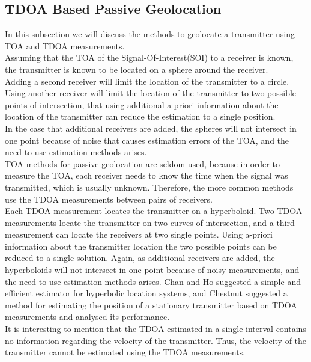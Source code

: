 \documentclass[10pt,a4paper]{report}
\begin{document}
\subsection{TDOA Based Passive Geolocation}
In this subsection we will discuss the methods to geolocate a transmitter using TOA and TDOA measurements.\\
Assuming that the TOA of the Signal-Of-Interest(SOI) to a receiver is known, the transmitter is known to be located on a sphere around the receiver. \\
Adding a second receiver will limit the location of the transmitter to a circle. Using another receiver will limit the location of the transmitter to two possible points of intersection, that using additional a-priori information about the location of the transmitter can reduce the estimation to a single position.\\
In the case that additional receivers are added, the spheres will not intersect in one point because of noise that causes estimation errors of the TOA, and the need to use estimation methods arises.\\

TOA methods for passive geolocation are seldom used, because in order to measure the TOA, each receiver needs to know the time when the signal was transmitted, which is usually unknown.
Therefore, the more common methods use the TDOA measurements between pairs of receivers.\\

Each TDOA measurement locates the transmitter on a hyperboloid. Two TDOA measurements locate the transmitter on two curves of intersection, and a third measurement can locate the receivers at two single points. Using a-priori information about the transmitter location the two possible points can be reduced to a single solution.
Again, as additional receivers are added, the hyperboloids will not intersect in one point because of noisy measurements, and the need to use estimation methods arises.
Chan and Ho \cite{chan_and_ho} suggested a simple and efficient estimator for hyperbolic location systems, and Chestnut \cite{chestnut} suggested a method for estimating the position of a stationary transmitter based on TDOA measurements and analysed its performance.\\

It is interesting to mention that the TDOA estimated in a single interval contains no information regarding the velocity of the transmitter. Thus, the velocity of the transmitter cannot be estimated using the TDOA measurements.\\
\end{document}
